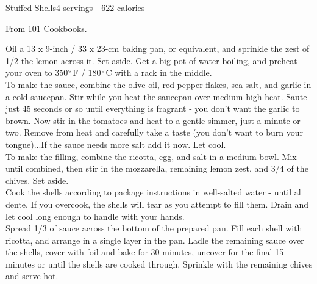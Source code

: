 \begin{recipe}{Stuffed Shells}{4 servings - 622 calories}{}

\freeform From 101 Cookbooks.


Oil a 13 x 9-inch / 33 x 23-cm baking pan, or equivalent, and sprinkle the zest of 1/2 the lemon across it. Set aside. Get a big pot of water boiling, and preheat your oven to 350$\degree$F / 180$\degree$C with a rack in the middle.\\

To make the sauce, combine the olive oil, red pepper flakes, sea salt, and garlic in a cold saucepan. Stir while you heat the saucepan over medium-high heat. Saute just 45 seconds or so until everything is fragrant - you don't want the garlic to brown. Now stir in the tomatoes and heat to a gentle simmer, just a minute or two. Remove from heat and carefully take a taste (you don't want to burn your tongue)...If the sauce needs more salt add it now. Let cool.\\

To make the filling, combine the ricotta, egg, and salt in a medium bowl. Mix until combined, then stir in the mozzarella, remaining lemon zest, and 3/4 of the chives. Set aside.\\

Cook the shells according to package instructions in well-salted water - until al dente. If you overcook, the shells will tear as you attempt to fill them. Drain and let cool long enough to handle with your hands.\\

Spread 1/3 of sauce across the bottom of the prepared pan. Fill each shell with ricotta, and arrange in a single layer in the pan. Ladle the remaining sauce over the shells, cover with foil and bake for 30 minutes, uncover for the final 15 minutes or until the shells are cooked through. Sprinkle with the remaining chives and serve hot.

\end{recipe}